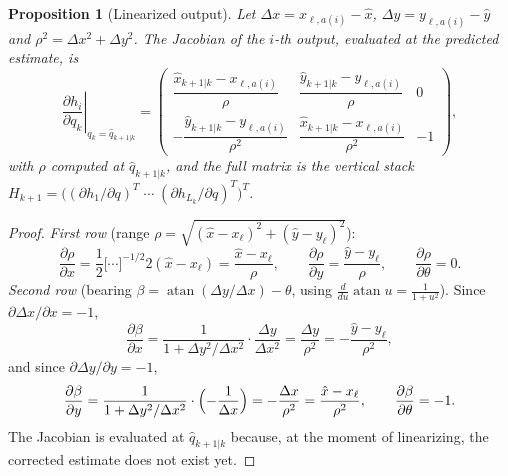 \documentclass[11pt,a4paper]{article}
\def\bm#1{#1}%
\def\boldsymbol#1{#1}%
\newcommand{\hq}{\hat{\boldsymbol{q}}}
\theoremstyle{definition}
\theoremstyle{plain}
\newtheorem{proposition}[definition]{Proposition}
\theoremstyle{remark}
\begin{document}
\begin{proposition}[Linearized output]
\label{prop:H}
Let $\Delta x=x_{\ell,a(i)}-\hat x$, $\Delta y=y_{\ell,a(i)}-\hat y$ and $\rho^2=\Delta x^2+\Delta y^2$. The Jacobian of the $i$-th output, evaluated at the \emph{predicted} estimate, is
\[
\left.\frac{\partial\bm h_i}{\partial\bm q_k}\right|_{\bm q_k=\hq_{k+1|k}}=
\begin{pmatrix}
\dfrac{\hat x_{k+1|k}-x_{\ell,a(i)}}{\rho} & \dfrac{\hat y_{k+1|k}-y_{\ell,a(i)}}{\rho} & 0\\[10pt]
-\dfrac{\hat y_{k+1|k}-y_{\ell,a(i)}}{\rho^2} & \dfrac{\hat x_{k+1|k}-x_{\ell,a(i)}}{\rho^2} & -1
\end{pmatrix},
\]
with $\rho$ computed at $\hq_{k+1|k}$, and the full matrix is the vertical stack
$\bm H_{k+1}=\bigl((\partial\bm h_1/\partial\bm q)^T\;\cdots\;(\partial\bm h_{L_k}/\partial\bm q)^T\bigr)^T$.
\end{proposition}
\begin{proof}
\emph{First row} (range $\rho=\sqrt{(\hat x-x_\ell)^2+(\hat y-y_\ell)^2}$):
\[
\frac{\partial\rho}{\partial x}=\frac12\bigl[\cdots\bigr]^{-1/2}2(\hat x-x_\ell)=\frac{\hat x-x_\ell}{\rho},\qquad
\frac{\partial\rho}{\partial y}=\frac{\hat y-y_\ell}{\rho},\qquad
\frac{\partial\rho}{\partial\theta}=0 .
\]
\emph{Second row} (bearing $\beta=\operatorname{atan}(\Delta y/\Delta x)-\theta$, using $\tfrac{d}{du}\operatorname{atan}u=\tfrac1{1+u^2}$). Since $\partial\Delta x/\partial x=-1$,
\[
\frac{\partial\beta}{\partial x}=\frac{1}{1+\Delta y^2/\Delta x^2}\cdot\frac{\Delta y}{\Delta x^2}=\frac{\Delta y}{\rho^2}=-\frac{\hat y-y_\ell}{\rho^2},
\]
and since $\partial\Delta y/\partial y=-1$,
\[
\frac{\partial\beta}{\partial y}=\frac{1}{1+\Delta y^2/\Delta x^2}\cdot\Bigl(-\frac{1}{\Delta x}\Bigr)=-\frac{\Delta x}{\rho^2}=\frac{\hat x-x_\ell}{\rho^2},\qquad
\frac{\partial\beta}{\partial\theta}=-1 .
\]
The Jacobian is evaluated at $\hq_{k+1|k}$ because, at the moment of linearizing, the corrected estimate does not exist yet.
\end{proof}
\end{document}
